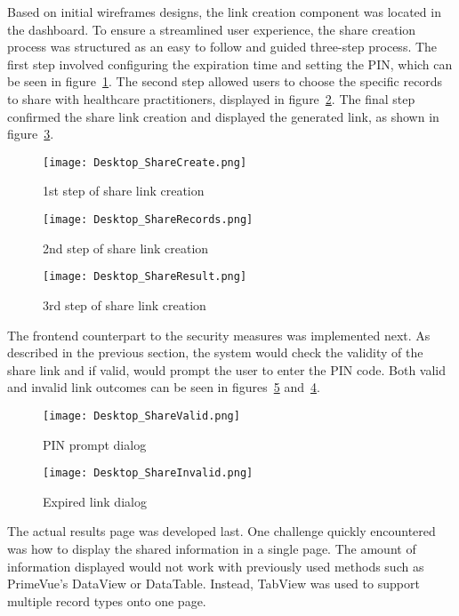 Based on initial wireframes designs, the link creation component was located in the dashboard. To ensure a streamlined user experience, the share creation process was structured as an easy to follow and guided three-step process. The first step involved configuring the expiration time and setting the PIN, which can be seen in figure~\ref{fig:share_create}. The second step allowed users to choose the specific records to share with healthcare practitioners, displayed in figure~\ref{fig:share_records}. The final step confirmed the share link creation and displayed the generated link, as shown in figure~\ref{fig:share_result}.

\begin{figure}[htbp]
  \centering
  \texttt{[image: Desktop\_ShareCreate.png]}
  \caption{1st step of share link creation}\label{fig:share_create}
\end{figure}

\begin{figure}[htbp]
  \centering
  \texttt{[image: Desktop\_ShareRecords.png]}
  \caption{2nd step of share link creation}\label{fig:share_records}
\end{figure}

\begin{figure}[htbp]
  \centering
  \texttt{[image: Desktop\_ShareResult.png]}
  \caption{3rd step of share link creation}\label{fig:share_result}
\end{figure}

The frontend counterpart to the security measures was implemented next. As described in the previous section, the system would check the validity of the share link and if valid, would prompt the user to enter the PIN code. Both valid and invalid link outcomes can be seen in figures~\ref{fig:share_invalid} and~\ref{fig:share_valid}.

\begin{figure}[htbp]
  \centering
  \texttt{[image: Desktop\_ShareValid.png]}
  \caption{PIN prompt dialog}\label{fig:share_valid}
\end{figure}

\begin{figure}[htbp]
  \centering
  \texttt{[image: Desktop\_ShareInvalid.png]}
  \caption{Expired link dialog}\label{fig:share_invalid}
\end{figure}

The actual results page was developed last. One challenge quickly encountered was how to display the shared information in a single page. The amount of information displayed would not work with previously used methods such as PrimeVue's DataView or DataTable. Instead, TabView was used to support multiple record types onto one page.

